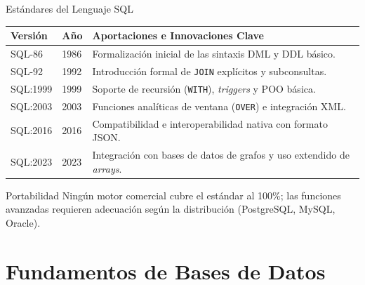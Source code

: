 \documentclass[12pt, aspectratio=169, UTF8]{beamer}
\begin{document}
\begin{frame}{Estándares del Lenguaje SQL}
  \begin{center}
  \small
  \renewcommand{\arraystretch}{1.15}
  \begin{tabularx}{0.95\textwidth}{@{} l l X @{}}
    \toprule
    \textbf{Versión} & \textbf{Año} & \textbf{Aportaciones e Innovaciones Clave} \\
    \midrule
    SQL-86    & 1986 & Formalización inicial de las sintaxis DML y DDL básico. \\
    SQL-92    & 1992 & Introducción formal de \texttt{JOIN} explícitos y subconsultas. \\
    SQL:1999  & 1999 & Soporte de recursión (\texttt{WITH}), \textit{triggers} y POO básica. \\
    SQL:2003  & 2003 & Funciones analíticas de ventana (\texttt{OVER}) e integración XML. \\
    SQL:2016  & 2016 & Compatibilidad e interoperabilidad nativa con formato JSON. \\
    SQL:2023  & 2023 & Integración con bases de datos de grafos y uso extendido de \textit{arrays}. \\
    \bottomrule
  \end{tabularx}
  \end{center}
  \begin{alertblock}{Portabilidad}
    Ningún motor comercial cubre el estándar al 100\%; las funciones avanzadas requieren adecuación según la distribución (PostgreSQL, MySQL, Oracle).
  \end{alertblock}
\end{frame}

\section{Fundamentos de Bases de Datos}
\end{document}
